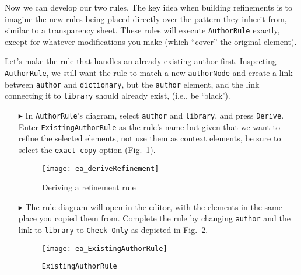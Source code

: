\newpage

Now we can develop our two rules. The key idea when building refinements is to imagine the new rules being placed directly over the pattern they inherit
from, similar to a transparency sheet. These rules will execute \texttt{AuthorRule} exactly, except for whatever modifications you make (which ``cover'' the
original element).

Let's make the rule that handles an already existing author first. Inspecting \texttt{AuthorRule}, we still want the rule to match a new \texttt{authorNode}
and create a link between \texttt{author} and \texttt{dictionary}, but the \texttt{author} element, and the link connecting it to \texttt{library} should
already exist, (i.e., be `black').

\begin{itemize}

\subsubsection{ExistingAuthorRule} %

\item[$\blacktriangleright$] In \texttt{AuthorRule}'s diagram, select \texttt{author} and \texttt{library}, and press \texttt{Derive}. Enter
\texttt{ExistingAuthorRule} as the rule's name but given that we want to refine the selected elements, not use them as context elements,
be sure to select the \texttt{exact copy} option (Fig.~\ref{ea:deriveRefinement}).

\begin{figure}[htbp]
\begin{center}
  \texttt{[image: ea\_deriveRefinement]}
  \caption{Deriving a refinement rule}
  \label{ea:deriveRefinement}
\end{center}
\end{figure}

\item[$\blacktriangleright$] The rule diagram will open in the editor, with the elements in the same place you copied them from. Complete the rule by changing
\texttt{author} and the link to \texttt{library} to \texttt{Check Only} as depicted in Fig.~\ref{ea:existingAuthorRule}.

\begin{figure}[htbp]
\begin{center}
  \texttt{[image: ea\_ExistingAuthorRule]}
  \caption{\texttt{ExistingAuthorRule}}
  \label{ea:existingAuthorRule}
\end{center}
\end{figure}


\end{itemize}

